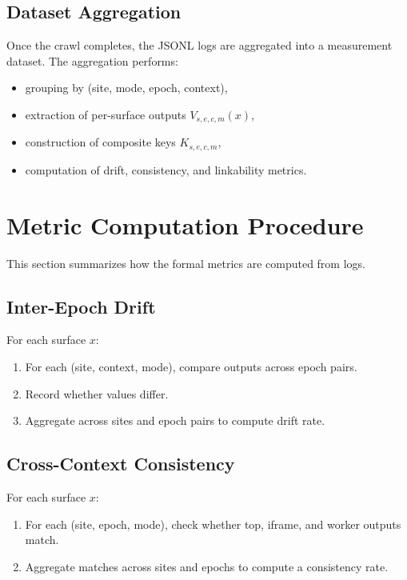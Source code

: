 \documentclass[11pt]{report}
\begin{document}
\subsection{Dataset Aggregation}

Once the crawl completes, the JSONL logs are aggregated into a measurement dataset. The aggregation performs:

\begin{itemize}
    \item grouping by (site, mode, epoch, context),
    \item extraction of per-surface outputs $V_{s,e,c,m}(x)$,
    \item construction of composite keys $K_{s,e,c,m}$,
    \item computation of drift, consistency, and linkability metrics.
\end{itemize}

\section{Metric Computation Procedure}

This section summarizes how the formal metrics are computed from logs.

\subsection{Inter-Epoch Drift}

For each surface $x$:
\begin{enumerate}
    \item For each (site, context, mode), compare outputs across epoch pairs.
    \item Record whether values differ.
    \item Aggregate across sites and epoch pairs to compute drift rate.
\end{enumerate}

\subsection{Cross-Context Consistency}

For each surface $x$:
\begin{enumerate}
    \item For each (site, epoch, mode), check whether top, iframe, and worker outputs match.
    \item Aggregate matches across sites and epochs to compute a consistency rate.
\end{enumerate}
\end{document}
